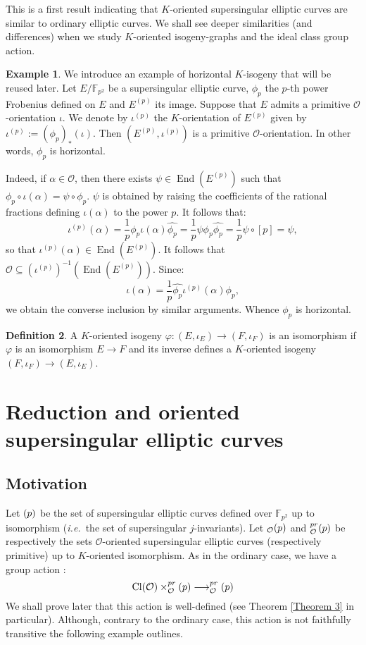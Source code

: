 \documentclass[a4paper,10pt,notitlepage]{report}
\theoremstyle{definition}
\newtheorem{Definition}{Definition}[chapter]
\theoremstyle{plain}
\theoremstyle{definition}
\newtheorem{Example}[Definition]{Example}
\newcommand{\ie}{\emph{i.e.}\ }
\newcommand{\F}{\mathbb{F}}
\newcommand{\mO}{\mathcal{O}}
\renewcommand{\(}{\left(}
\renewcommand{\)}{\right)}
\DeclareMathOperator{\End}{End}
\DeclareMathOperator{\Cl}{Cl}
\let\SS\relax
\DeclareMathOperator{\SS}{SS}
\begin{document}
This is a first result indicating that $K$-oriented supersingular elliptic curves are similar to ordinary elliptic curves. We shall see deeper similarities (and differences) when we study $K$-oriented isogeny-graphs and the ideal class group action.

\begin{Example}
We introduce an example of horizontal $K$-isogeny that will be reused later.  Let $E/\F_{p^2}$ be a supersingular elliptic curve, $\phi_p$ the $p$-th power Frobenius defined on $E$ and $E^{(p)}$ its image. Suppose that $E$ admits a primitive $\mO$-orientation $\iota$.  We denote by $\iota^{(p)}$ the $K$-orientation of $E^{(p)}$ given by $\iota^{(p)}:=(\phi_p)_*(\iota)$.  Then $(E^{(p)},\iota^{(p)})$ is a primitive $\mO$-orientation.  In other words, $\phi_p$ is horizontal.

Indeed, if $\alpha\in\mO$, then there exists $\psi\in\End(E^{(p)})$ such that $\phi_p\circ\iota(\alpha)=\psi\circ\phi_p$. $\psi$ is obtained by raising the coefficients of the rational fractions defining $\iota(\alpha)$ to the power $p$. It follows that:
\[\iota^{(p)}(\alpha)=\frac{1}{p}\phi_p\iota(\alpha)\widehat{\phi_p}=\frac{1}{p}\psi\phi_p\widehat{\phi_p}=\frac{1}{p}\psi\circ[p]=\psi,\]
so that $\iota^{(p)}(\alpha)\in\End(E^{(p)})$. It follows that $\mO\subseteq\(\iota^{(p)}\)^{-1}\(\End\(E^{(p)}\)\)$. Since:
\[\iota(\alpha)=\frac{1}{p}\widehat{\phi_p}\iota^{(p)}(\alpha)\phi_p,\]
we obtain the converse inclusion by similar arguments.  Whence $\phi_p$ is horizontal.
\end{Example}

\begin{Definition}
A $K$-oriented isogeny $\varphi : (E, \iota_E)\longrightarrow(F,\iota_F)$ is an isomorphism if $\varphi$ is an isomorphism $E\longrightarrow F$ and its inverse defines a $K$-oriented isogeny $(F, \iota_F)\longrightarrow(E,\iota_E)$.
\end{Definition}

\section{Reduction and oriented supersingular elliptic curves}

\subsection{Motivation}

Let $\SS(p)$ be the set of supersingular elliptic curves defined over $\F_{p^2}$ up to isomorphism (\ie the set of supersingular $j$-invariants). Let $\SS_{\mO}(p)$ and $\SS_{\mO}^{pr}(p)$ be respectively the sets $\mO$-oriented supersingular elliptic curves (respectively primitive) up to $K$-oriented isomorphism.  As in the ordinary case,  we have a group action :
\[\Cl(\mO)\times \SS_{\mO}^{pr}(p) \longrightarrow \SS_{\mO}^{pr}(p)\]
We shall prove later that this action is well-defined (see Theorem \ref{Theorem 3} in particular).  Although,  contrary to the ordinary case,  this action is not faithfully transitive the following example outlines.
\end{document}
